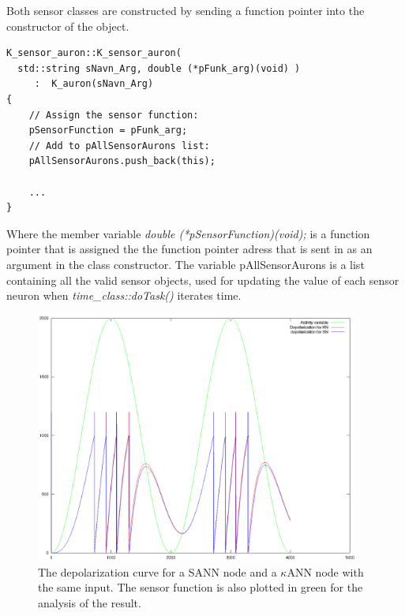 Both sensor classes are constructed by sending a function pointer into the constructor of the object. 

\begin{lstlisting}
K_sensor_auron::K_sensor_auron(
  std::string sNavn_Arg, double (*pFunk_arg)(void) ) 
     :  K_auron(sNavn_Arg)
{
	// Assign the sensor function:
	pSensorFunction = pFunk_arg;
	// Add to pAllSensorAurons list:
	pAllSensorAurons.push_back(this);

	...
}
\end{lstlisting}

Where the member variable \emph{double \mbox{(*pSensorFunction)(void);}} is a function pointer that is assigned the the function pointer adress that is sent in as an argument in the class constructor.
The variable pAllSensorAurons is a list containing all the valid sensor objects, used for updating the value of each sensor neuron when \emph{time\_class::doTask()} iterates time. %

\begin{figure}[hbtp!]
	\centering
		\includegraphics[width=0.95\textwidth]{eps_Comparison_between_the_two_sensors__depol.eps}
	\caption{The depolarization curve for a SANN node and a $\kappa$ANN node with the same input. The sensor function is also plotted in green for the analysis of the result.}
	\label{figComparisonBetweenSsensorAndKsensorDepolCurve}
\end{figure}

